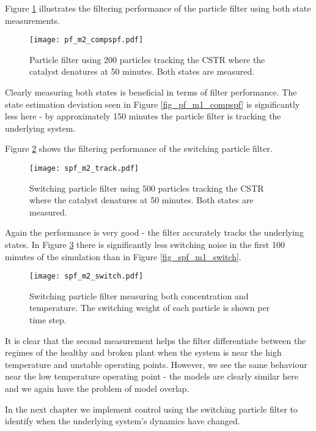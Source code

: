 Figure \ref{fig_pf_m2_compspf} illustrates the filtering performance of the particle filter using both state measurements.
\begin{figure}[H] 
\centering
\texttt{[image: pf\_m2\_compspf.pdf]}
\caption{Particle filter using 200 particles tracking the CSTR where the catalyst denatures at 50 minutes. Both states are measured.}
\label{fig_pf_m2_compspf}
\end{figure}
Clearly measuring both states is beneficial in terms of filter performance. The state estimation deviation seen in Figure \ref{fig_pf_m1_compspf} is significantly less here - by approximately 150 minutes the particle filter is tracking the underlying system.

Figure \ref{fig_spf_m2_track} shows the filtering performance of the switching particle filter. 
\begin{figure}[H] 
\centering
\texttt{[image: spf\_m2\_track.pdf]}
\caption{Switching particle filter using 500 particles tracking the CSTR where the catalyst denatures at 50 minutes. Both states are measured.}
\label{fig_spf_m2_track}
\end{figure}
Again the performance is very good - the filter accurately tracks the underlying states. In Figure \ref{fig_spf_m2_switch} there is significantly less switching noise in the first 100 minutes of the simulation than in Figure \ref{fig_spf_m1_switch}.
\begin{figure}[H] 
\centering
\texttt{[image: spf\_m2\_switch.pdf]}
\caption{Switching particle filter measuring both concentration and temperature. The switching weight of each particle is shown per time step.}
\label{fig_spf_m2_switch}
\end{figure} 
It is clear that the second measurement helps the filter differentiate between the regimes of the healthy and broken plant when the system is near the high temperature and unstable operating points. However, we see the same behaviour near the low temperature operating point - the models are clearly similar here and we again have the problem of model overlap. 

In the next chapter we implement control using the switching particle filter to identify when the underlying system's dynamics have changed. 
